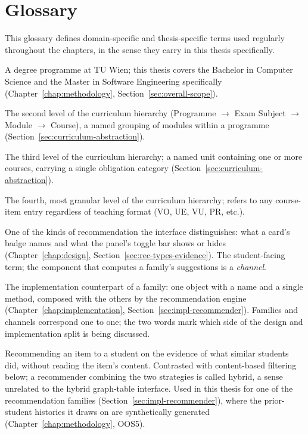 \chapter{Glossary}
\label{app:glossary}

This glossary defines domain-specific and thesis-specific terms used regularly throughout the chapters, in the sense they carry in this thesis specifically.

\begin{description}
  \label{gls:programme}
  \item[Programme] A degree programme at TU Wien; this thesis covers the Bachelor in Computer Science and the Master in Software Engineering specifically (Chapter~\ref{chap:methodology}, Section~\ref{sec:overall-scope}).
  \label{gls:exam-subject}
  \item[Exam Subject] The second level of the curriculum hierarchy (Programme $\to$ Exam Subject $\to$ Module $\to$ Course), a named grouping of modules within a programme (Section~\ref{sec:curriculum-abstraction}).
  \label{gls:module}
  \item[Module] The third level of the curriculum hierarchy; a named unit containing one or more courses, carrying a single obligation category (Section~\ref{sec:curriculum-abstraction}).
  \label{gls:course}
  \item[Course (course item)] The fourth, most granular level of the curriculum hierarchy; refers to any course-item entry regardless of teaching format (VO, UE, VU, PR, etc.).
  \label{gls:recommendation-family}
  \item[Recommendation family] One of the kinds of recommendation the interface distinguishes: what a card's badge names and what the panel's toggle bar shows or hides (Chapter~\ref{chap:design}, Section~\ref{sec:rec-types-evidence}). The student-facing term; the component that computes a family's suggestions is a \emph{channel}.
  \label{gls:recommendation-channel}
  \item[Recommendation channel] The implementation counterpart of a family: one object with a name and a single method, composed with the others by the recommendation engine (Chapter~\ref{chap:implementation}, Section~\ref{sec:impl-recommender}). Families and channels correspond one to one; the two words mark which side of the design and implementation split is being discussed.

  \label{gls:collaborative-filtering}
  \item[Collaborative filtering] Recommending an item to a student on the evidence of what similar students did, without reading the item's content. Contrasted with content-based filtering below; a recommender combining the two strategies is called hybrid, a sense unrelated to the hybrid graph-table interface. Used in this thesis for one of the recommendation families (Section~\ref{sec:impl-recommender}), where the prior-student histories it draws on are synthetically generated (Chapter~\ref{chap:methodology}, OOS5).


\end{description}
